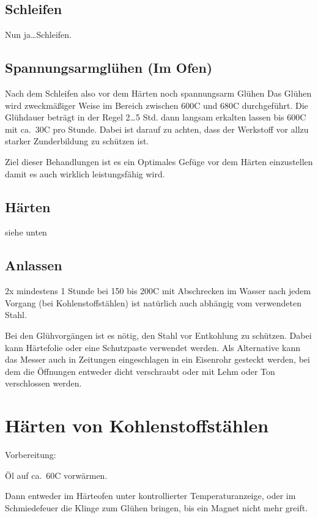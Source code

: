 \documentclass[a4paper]{scrartcl} %
\begin{document}
\subsection{Schleifen}
Nun ja{\ldots}Schleifen.

\subsection{Spannungsarmglühen (Im Ofen)}
Nach dem Schleifen also vor dem Härten noch spannungsarm Glühen
Das Glühen wird zweckmäßiger Weise im Bereich zwischen 600{\degree}C und 680{\degree}C durchgeführt. Die Glühdauer beträgt in der Regel 2{\ldots}5 Std. dann langsam erkalten lassen bis 600{\degree}C mit ca.\ 30{\degree}C pro Stunde. Dabei ist darauf zu achten, dass der Werkstoff vor allzu starker Zunderbildung zu schützen ist.

Ziel dieser Behandlungen ist es ein Optimales Gefüge vor dem Härten einzustellen damit es auch wirklich leistungsfähig wird.

\subsection{Härten}
siehe unten

\subsection{Anlassen}
2x mindestens 1 Stunde bei 150 bis 200{\degree}C mit Abschrecken im Wasser nach jedem Vorgang (bei Kohlenstoffstählen)
ist natürlich auch abhängig vom verwendeten Stahl.

Bei den Glühvorgängen ist es nötig, den Stahl vor Entkohlung zu schützen. Dabei kann Härtefolie oder eine Schutzpaste verwendet werden.
Als Alternative kann das Messer auch in Zeitungen eingeschlagen in ein Eisenrohr gesteckt werden, bei dem die Öffnungen entweder dicht verschraubt oder mit Lehm oder Ton verschlossen werden.

\section{Härten von Kohlenstoffstählen}

Vorbereitung:

Öl auf ca.\  60{\degree}C vorwärmen.

Dann entweder im Härteofen unter kontrollierter Temperaturanzeige, oder im Schmiedefeuer die Klinge zum Glühen bringen, bis ein Magnet nicht mehr greift.
\end{document}
